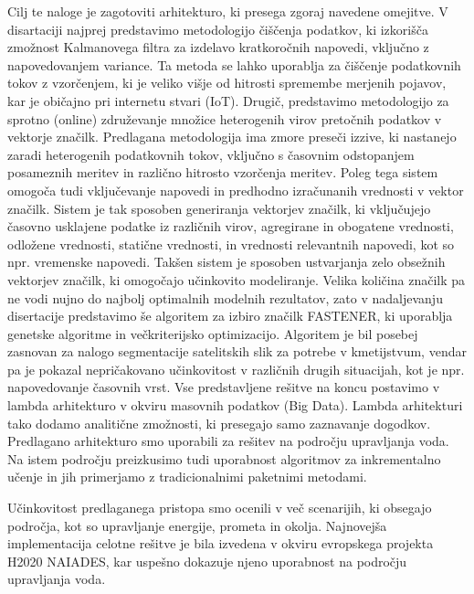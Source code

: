 Cilj te naloge je zagotoviti arhitekturo, ki presega zgoraj navedene omejitve. 
V disartaciji najprej predstavimo metodologijo čiščenja podatkov, ki izkorišča zmožnost Kalmanovega filtra za izdelavo kratkoročnih napovedi, vključno z napovedovanjem variance. 
Ta metoda se lahko uporablja za čiščenje podatkovnih tokov z vzorčenjem, ki je veliko višje od hitrosti spremembe merjenih pojavov, kar je običajno pri internetu stvari (IoT). 
Drugič, predstavimo metodologijo za sprotno (online) združevanje množice heterogenih virov pretočnih podatkov v vektorje značilk. 
Predlagana metodologija ima zmore preseči izzive, ki nastanejo zaradi heterogenih podatkovnih tokov, vključno s časovnim odstopanjem posameznih meritev in različno hitrosto vzorčenja meritev. 
Poleg tega sistem omogoča tudi vključevanje napovedi in predhodno izračunanih vrednosti v vektor značilk. 
Sistem je tak sposoben generiranja vektorjev značilk, ki vključujejo časovno usklajene podatke iz različnih virov, agregirane in obogatene vrednosti, odložene vrednosti, statične vrednosti, in vrednosti relevantnih napovedi, kot so npr. vremenske napovedi. 
Takšen sistem je sposoben ustvarjanja zelo obsežnih vektorjev značilk, ki omogočajo učinkovito modeliranje.
Velika količina značilk pa ne vodi nujno do najbolj optimalnih modelnih rezultatov, zato v nadaljevanju disertacije predstavimo še algoritem za izbiro značilk FASTENER, ki uporablja genetske algoritme in večkriterijsko optimizacijo. 
Algoritem je bil posebej zasnovan za nalogo segmentacije satelitskih slik za potrebe v kmetijstvum, vendar pa je pokazal nepričakovano učinkovitost v različnih drugih situacijah, kot je npr. napovedovanje časovnih vrst. 
Vse predstavljene rešitve na koncu postavimo v lambda arhitekturo v okviru masovnih podatkov (Big Data).
Lambda arhitekturi tako dodamo analitične zmožnosti, ki presegajo samo zaznavanje dogodkov.
Predlagano arhitekturo smo uporabili za rešitev na področju upravljanja voda. 
Na istem področju preizkusimo tudi uporabnost algoritmov za inkrementalno učenje in jih primerjamo z tradicionalnimi paketnimi metodami.

Učinkovitost predlaganega pristopa smo ocenili v več scenarijih, ki obsegajo področja, kot so upravljanje energije, prometa in okolja. 
Najnovejša implementacija celotne rešitve je bila izvedena v okviru evropskega projekta H2020 NAIADES, kar uspešno dokazuje njeno uporabnost na področju upravljanja voda.